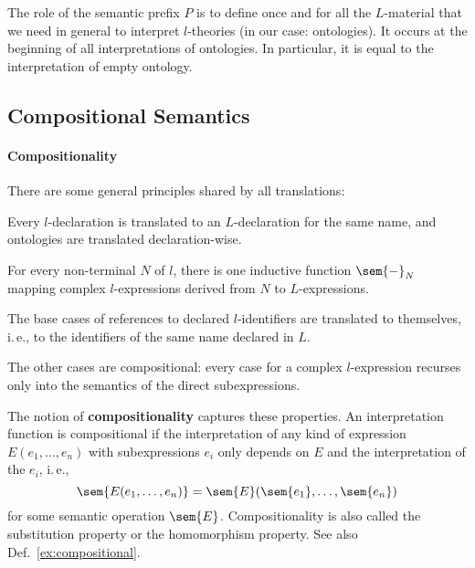 The role of the semantic prefix $P$ is to define once and for all the $L$-material that we need in general to interpret $l$-theories (in our case: ontologies).
It occurs at the beginning of all interpretations of ontologies.
In particular, it is equal to the interpretation of empty ontology.

\subsection{Compositional Semantics}

\paragraph{Compositionality}
There are some general principles shared by all translations:
\begin{compactitem}
 \item Every $l$-declaration is translated to an $L$-declaration for the same name, and ontologies are translated declaration-wise.
 \item For every non-terminal $N$ of $l$, there is one inductive function $\sem{-}_N$ mapping complex $l$-expressions derived from $N$ to $L$-expressions.
 \item The base cases of references to declared $l$-identifiers are translated to themselves, i.\,e., to the identifiers of the same name declared in $L$.
 \item The other cases are compositional: every case for a complex $l$-expression recurses only into the semantics of the direct subexpressions.
\end{compactitem}

The notion of \textbf{compositionality} captures these properties.
An interpretation function is compositional if the interpretation of any kind of expression $E(e_1,\ldots,e_n)$ with subexpressions $e_i$ only depends on $E$ and the interpretation of the $e_i$, i.\,e., \[\sem{E(e_1,\ldots,e_n)}=\sem{E}(\sem{e_1},\ldots,\sem{e_n})\] for some semantic operation $\sem{E}$.
Compositionality is also called the substitution property or the homomorphism property.
See also Def.~\ref{ex:compositional}.

